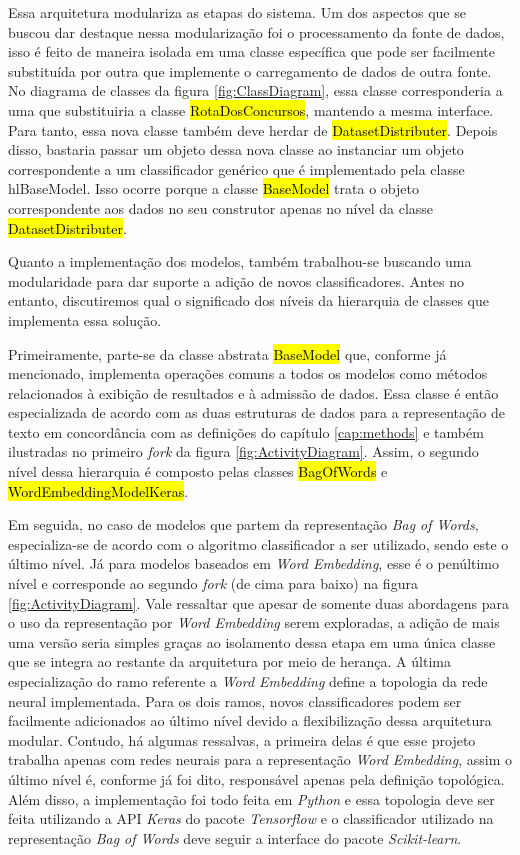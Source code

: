 Essa arquitetura modulariza as etapas do sistema. Um dos aspectos que se buscou dar destaque nessa modularização foi o processamento da fonte de dados, isso é feito de maneira isolada em uma classe específica que pode ser facilmente substituída por outra que implemente o carregamento de dados de outra fonte. No diagrama de classes da figura \ref{fig:ClassDiagram}, essa classe corresponderia a uma que substituiria a classe \hl{RotaDosConcursos}, mantendo a mesma interface. Para tanto, essa nova classe também deve herdar de \hl{DatasetDistributer}. Depois disso, bastaria passar um objeto dessa nova classe ao instanciar um objeto correspondente a um classificador genérico que é implementado pela classe hl{BaseModel}. Isso ocorre porque a classe \hl{BaseModel} trata o objeto correspondente aos dados no seu construtor apenas no nível da classe \hl{DatasetDistributer}.

Quanto a implementação dos modelos, também trabalhou-se buscando uma modularidade para dar suporte a adição de novos classificadores. Antes no entanto, discutiremos qual o significado dos níveis da hierarquia de classes que implementa essa solução.

Primeiramente, parte-se da classe abstrata \hl{BaseModel} que, conforme já mencionado, implementa operações comuns a todos os modelos como métodos relacionados à exibição de resultados e à admissão de dados. Essa classe é então especializada de acordo com as duas estruturas de dados para a representação de texto em concordância com as definições do capítulo \ref{cap:methods} e também ilustradas no primeiro \textit{fork} da figura \ref{fig:ActivityDiagram}. Assim, o segundo nível dessa hierarquia é composto pelas classes \hl{BagOfWords} e \hl{WordEmbeddingModelKeras}.

Em seguida, no caso de modelos que partem da representação \textit{Bag of Words}, especializa-se de acordo com o algoritmo classificador a ser utilizado, sendo este o último nível. Já para modelos baseados em \textit{Word Embedding}, esse é o penúltimo nível e corresponde ao segundo \textit{fork} (de cima para baixo) na figura \ref{fig:ActivityDiagram}. Vale ressaltar que apesar de somente duas abordagens para o uso da representação por \textit{Word Embedding} serem exploradas, a adição de mais uma versão seria simples graças ao isolamento dessa etapa em uma única classe que se integra ao restante da arquitetura por meio de herança. A última especialização do ramo referente a \textit{Word Embedding} define a topologia da rede neural implementada. Para os dois ramos, novos classificadores podem ser facilmente adicionados ao último nível devido a flexibilização dessa arquitetura modular. Contudo, há algumas ressalvas, a primeira delas é que esse projeto trabalha apenas com redes neurais para a representação \textit{Word Embedding}, assim o último nível é, conforme já foi dito, responsável apenas pela definição topológica. Além disso, a implementação foi todo feita em \textit{Python} e essa topologia deve ser feita utilizando a API \textit{Keras} do pacote \textit{Tensorflow} e o classificador utilizado na representação \textit{Bag of Words} deve seguir a interface do pacote \textit{Scikit-learn}.

